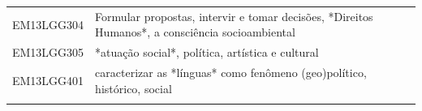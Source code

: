\documentclass[12pt]{extarticle}
\begin{document}
\begin{longtable}{ll}
EM13LGG304 & Formular propostas, intervir e tomar decisões, *Direitos Humanos*, a consciência socioambiental                                                                                                                                                                                                                                                                                                                                                                                                                                                                                                                                                                                                                                                                                                                       \\
\rowcolor[HTML]{E0F7FA} 
EM13LGG305 & *atuação social*, política, artística e cultural                                                                                                                                                                                                                                                                                                                                                                                                                                                                                                                                                                                                                                                                                                                                                                      \\
\rowcolor[HTML]{FFF} 
EM13LGG401 & caracterizar as *línguas* como fenômeno (geo)político, histórico, social                                                                                                                                                                                                                                                                                                                                                                                                                                                                                                                                                                                                                                                                                                                                              \\
\rowcolor[HTML]{E0F7FA} 

\end{longtable}
\end{document}
